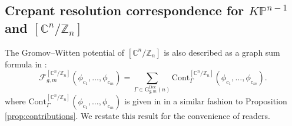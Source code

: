 \documentclass[12pt]{amsart}
\numberwithin{equation}{section}
\newcommand{\CnZn}{[\mathbb{C}^n/\mathbb{Z}_n]}
\newcommand{\KP}{K\mathbb{P}}
\begin{document}
\subsection{Crepant resolution correspondence for \texorpdfstring{$\KP^{n-1}$}{KP{n-1}} and \texorpdfstring{$[\mathbb{C}^n/\mathbb{Z}_n]$}{CnZn}}\label{sec:CRC}
The Gromov--Witten potential of $\CnZn$ is also described as a graph sum formula in \cite{gt}:
\begin{equation}\label{eqn:formula_Fg2}
\mathcal{F}_{g, m}^{\left[\mathbb{C}^{n} / \mathbb{Z}_{n}\right]}\left(\phi_{c_{1}}, \ldots, \phi_{c_{m}}\right)=\sum_{\Gamma\in\mathrm{G}_{g,m}^{\text{Dec}}(n)}\mathrm{Cont}_{\Gamma}^{\CnZn}\left(\phi_{c_{1}}, \ldots, \phi_{c_{m}}\right).
\end{equation}
where ${\mathrm{Cont}}^{\CnZn}_{\Gamma}\left(\phi_{c_{1}}, \ldots, \phi_{c_{m}}\right)$ is given in \cite[Proposition 3.3]{gt} in a similar fashion to Proposition \ref{prop:contributions}. We restate this result for the convenience of readers.
\end{document}
